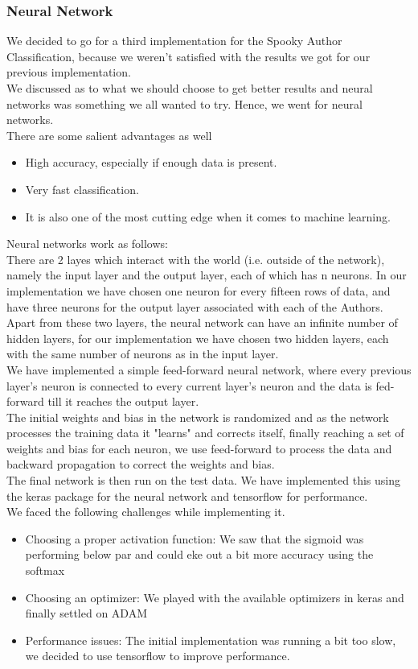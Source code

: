 \documentclass[fleqn,10pt]{SelfArx} %
\begin{document}
\subsubsection{Neural Network}
We decided to go for a third implementation for the Spooky Author Classification, because we weren't satisfied with the results we got for our previous implementation.\\
We discussed as to what we should choose to get better results and neural networks was something we all wanted to try. Hence, we went for neural networks.\\
There are some salient advantages as well\\
\begin{itemize}[noitemsep]
	\item High accuracy, especially if enough data is present.
	\item Very fast classification.
	\item It is also one of the most cutting edge when it comes to machine learning.
\end{itemize}
Neural networks work as follows:\\
There are 2 layes which interact with the world (i.e. outside of the network), namely the input layer and the output layer, each of which has n neurons. In our implementation we have chosen one neuron for every fifteen rows of data, and have three neurons for the output layer associated with each of the Authors. Apart from these two layers, the neural network can have an infinite number of hidden layers, for our implementation we have chosen two hidden layers, each with the same number of neurons as in the input layer.\\
We have implemented a simple feed-forward neural network, where every previous layer's neuron is connected to every current layer's neuron and the data is fed-forward till it reaches the output layer.\\
The initial weights and bias in the network is randomized and as the network processes the training data it "learns" and corrects itself, finally reaching a set of weights and bias for each neuron, we use feed-forward to process the data and backward propagation to correct the weights and bias.\\
The final network is then run on the test data. We have implemented this using the keras package for the neural network and tensorflow for performance.\\
We faced the following challenges while implementing it.
\begin{itemize}[noitemsep]
	\item Choosing a proper activation function: We saw that the sigmoid was performing below par and could eke out a bit more accuracy using the softmax
	\item Choosing an optimizer: We played with the available optimizers in keras and finally settled on ADAM
	\item Performance issues: The initial implementation was running a bit too slow, we decided to use tensorflow to improve performance.
\end{itemize}
\end{document}
